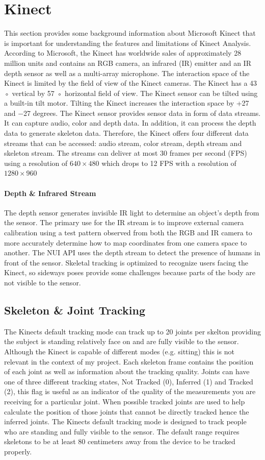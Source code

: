 \section{Kinect}
This section provides some background information about Microsoft Kinect that is important
for understanding the features and limitations of Kinect Analysis.
According to Microsoft, the Kinect  has worldwide sales of approximately 28 million units and contains an RGB camera, an infrared (IR) emitter and an IR depth sensor as well as a multi-array microphone. The interaction space of the Kinect is limited by the field of view of the Kinect cameras. The Kinect has a 43 ◦ vertical by 57 ◦ horizontal field of view. The Kinect sensor can be tilted using a built-in tilt motor. Tilting the Kinect increases the interaction space by +27 and −27 degrees.
The Kinect sensor provides sensor data in form of data streams. It can capture audio, color
and depth data. In addition, it can process the depth data to generate skeleton data. Therefore, the Kinect offers four different data streams that can be accessed: audio stream, color stream, depth stream and skeleton stream.
The streams can deliver at most 30 frames per second (FPS) using a resolution of $640\times480$ which drops to 12 FPS with a resolution of $1280\times960$

\paragraph{Depth \& Infrared Stream}
The depth sensor generates invisible IR light to determine an object's depth from the sensor. The primary use for the IR stream is to improve external camera calibration using a test pattern observed from both the RGB and IR camera to more accurately determine how to map coordinates from one camera space to another. \cite{irstream} The NUI API uses the depth stream to detect the presence of humans in front of the sensor.\cite{winSDK} Skeletal tracking is optimized to recognize users facing the Kinect, so sideways poses provide some challenges because parts of the body are not visible to the sensor.

\subsection{Skeleton \& Joint Tracking}
The Kinects default tracking mode can track up to 20 joints per skelton providing the subject is standing relatively face on and are fully visible to the sensor. Although the Kinect is capable of different modes (e.g. sitting) this is not relevant in the context of my project.
Each skeleton frame contains the position of each joint as well as information about the tracking quality. Joints can have one of three different tracking states, Not Tracked (0), Inferred (1) and Tracked (2), this flag is useful as an indicator of the quality of the measurements you are receiving for a particular joint. When possible tracked joints are used to help calculate the position of those joints that cannot be directly tracked hence the inferred joints. The Kinects default tracking mode is designed to track people who are standing and fully visible to the sensor.  The default range requires skeletons to be at least 80 centimeters away from the device to be tracked properly.

